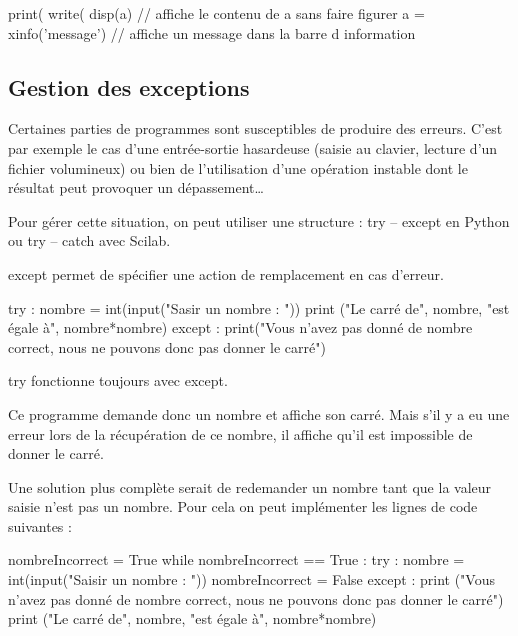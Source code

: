\documentclass[10pt,fleqn]{article} %
\begin{document}
\begin{minipage}[c]{.95\linewidth}
\begin{sci}
\begin{scilab}
print(%
write(%
disp(a)               // affiche le contenu de a sans faire figurer a = 
xinfo('message')  // affiche un message dans la barre d information
\end{scilab}
\end{sci}

\end{minipage}


\subsection{Gestion des exceptions}


Certaines parties de programmes sont susceptibles de produire des erreurs. C'est par exemple le cas d'une entrée-sortie hasardeuse (saisie au clavier, lecture d'un fichier volumineux) ou bien de l'utilisation d'une opération instable dont le résultat peut provoquer un dépassement…
 
Pour gérer cette situation, on peut utiliser une structure : \textsf{try} -- \textsf{except} en Python ou \textsf{try} -- \textsf{catch} avec Scilab.

\textsf{except} permet de spécifier une action de remplacement en cas d'erreur.

\begin{minipage}[c]{.95\linewidth}

\begin{py}
\begin{python}
try :
    nombre = int(input("Sasir un nombre : "))
    print ("Le carré de", nombre, "est égale à", nombre*nombre)
except : 
    print("Vous n'avez pas donné de nombre correct, nous ne pouvons donc pas donner le carré") 
\end{python}
\end{py}
\end{minipage}

\textsf{try} fonctionne toujours avec \textsf{except}.

Ce programme demande donc un nombre et affiche son carré. Mais s'il y a eu une erreur lors de la récupération de ce nombre, il affiche qu'il est impossible de donner le carré.

Une solution plus complète serait de redemander un nombre tant que la valeur saisie n'est pas un nombre. Pour cela on peut implémenter les lignes de code suivantes :
\begin{py}
\begin{python}
nombreIncorrect = True
while nombreIncorrect == True :
    try :
        nombre = int(input("Saisir un nombre : "))
        nombreIncorrect = False
    except :
        print ("Vous n'avez pas donné de nombre correct, nous ne pouvons donc pas donner le carré")
print ("Le carré de", nombre, "est égale à", nombre*nombre)
\end{python}
\end{py}
\end{document}
